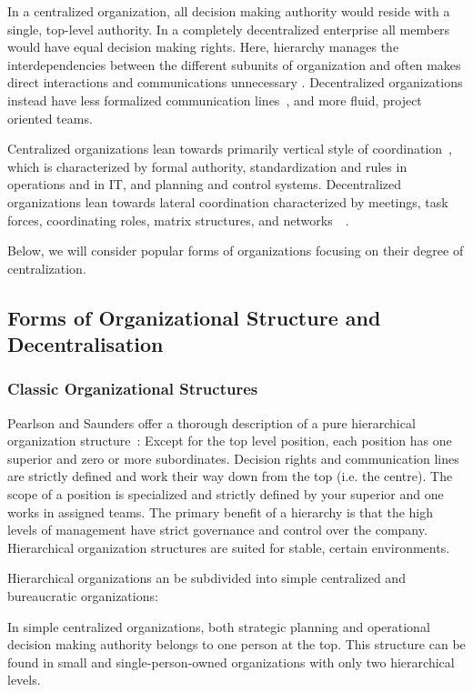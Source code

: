 In a centralized organization, all decision making authority would reside with a single, top-level authority. In a completely decentralized enterprise all members would have equal decision making rights. Here, hierarchy manages the interdependencies between the different subunits of organization and often makes direct interactions and communications unnecessary \cite{thompson1967}.  Decentralized organizations instead have less formalized communication lines~\cite{pearlson2009}, and more fluid, project oriented teams.~\cite{applegate1988}

Centralized organizations lean towards primarily vertical style of coordination~\cite{Bolman2008}, which is characterized by formal authority, standardization and rules in operations and in IT, and planning and control systems. Decentralized organizations lean towards lateral coordination characterized by meetings, task forces, coordinating roles, matrix structures, and networks~~\cite{Bolman2008}. 

Below, we will consider popular forms of organizations focusing on their degree of centralization. 

\subsection{Forms of Organizational Structure and Decentralisation}

\subsubsection{Classic Organizational Structures}

Pearlson and Saunders offer a thorough description of a pure hierarchical organization structure~\cite{pearlson2009}: Except for the top level position, each position has one superior and zero or more subordinates. Decision rights and communication lines are strictly defined and work their way down from the top (i.e. the centre). The scope of a position is specialized and strictly defined by your superior and one works in assigned teams. The primary benefit of a hierarchy is that the high levels of management have strict governance and control over the company. Hierarchical organization structures are suited for stable, certain environments. 

Hierarchical organizations an be subdivided into simple centralized and bureaucratic organizations:

In simple centralized organizations, both strategic planning and operational decision making authority belongs to one person at the top. This structure can be found in small and single-person-owned organizations with only two hierarchical levels. 

